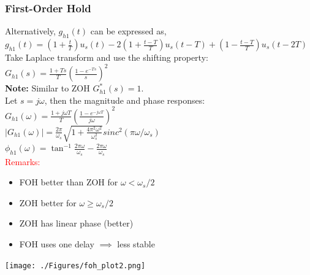 \documentclass[mathserif, 10pt]{beamer} %
\begin{document}
\frame
{

\frametitle{First-Order Hold}
\small
\vspace{-.2in}	
Alternatively, $g_{h1}(t)$ can be expressed as, \\
$g_{h1}(t) = (1+\frac{t}{T})u_s(t) - 2(1+\frac{t-T}{T}) u_s(t-T) +(1-\frac{t-T}{T})u_s(t-2T)$\\ \vspace{.07in}
Take Laplace transform and use  the shifting property:\\
$G_{h1}(s) = \frac{1+Ts}{T}\left(\frac{1-e^{-Ts}}{s}\right )^2$\\ \vspace{.07in}
\textbf{Note:}  Similar to ZOH $G^*_{h1}(s)=1$. \\
Let $s=j\omega$, then the magnitude and phase responses:\\ \vspace{.07in}
$G_{h1}(\omega) = \frac{1+j\omega T}{T}\left(\frac{1-e^{-j\omega T}}{j\omega}\right )^2$\\ \vspace{.09in}
$|G_{h1}(\omega)| =\frac{2\pi}{\omega_s} \sqrt{1+\frac{4\pi^2\omega^2}{\omega_{s}^2}}sinc^2(\pi \omega/\omega_s)$\\ \vspace{.09in}
$\phi_{h1}(\omega) = \tan^{-1} \frac{2\pi \omega}{\omega_s}-\frac{2\pi \omega}{\omega_s}$\\ \vspace{.09in}
\textcolor{red}{Remarks:}\\
\begin{itemize}
	\item FOH better than ZOH for $\omega < \omega_s/2$
	\item ZOH better for $\omega \ge \omega_s/2$
	\item ZOH has linear phase (better)
	\item FOH uses one delay $\implies$ less stable
\end{itemize}
\vspace{-2in}
\hspace{3in}
\texttt{[image: ./Figures/foh\_plot2.png]}



}




\end{document}
